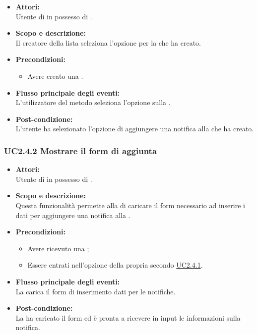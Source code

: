 \begin{itemize}
	\item \textbf{Attori:}
	\\Utente di  in possesso di \ProjectName{}.
	\item \textbf{Scopo e descrizione:} 
	\\Il creatore della lista seleziona l'opzione  per la  che ha creato.
	\item \textbf{Precondizioni:}
	\begin{itemize}
		\item Avere creato una  .
	\end{itemize}
	\item \textbf{Flusso principale degli eventi:}
	\\L'utilizzatore del metodo seleziona l'opzione  sulla .
	\item \textbf{Post-condizione:}
	\\L'utente ha selezionato l'opzione di aggiungere una notifica alla  che ha creato.
\end{itemize}

\subsubsection{UC2.4.2 Mostrare il form di aggiunta} \label{UC2.4.2}

\begin{itemize}
	\item \textbf{Attori:}
	\\Utente di  in possesso di \ProjectName{}.
	\item \textbf{Scopo e descrizione:} 
	\\Questa funzionalità permette alla  di caricare il form necessario ad inserire i dati per aggiungere una notifica alla .
	\item \textbf{Precondizioni:}
	\begin{itemize}
		\item Avere ricevuto una  ;
		\item Essere entrati nell'opzione  della propria  secondo \hyperref[UC2.4.1]{UC2.4.1}.
	\end{itemize}
	\item \textbf{Flusso principale degli eventi:}
	\\La {}  carica il form di inserimento dati per le notifiche.
	\item \textbf{Post-condizione:}
	\\La {} ha caricato il form ed è pronta a ricevere in input le informazioni sulla notifica.
\end{itemize}

